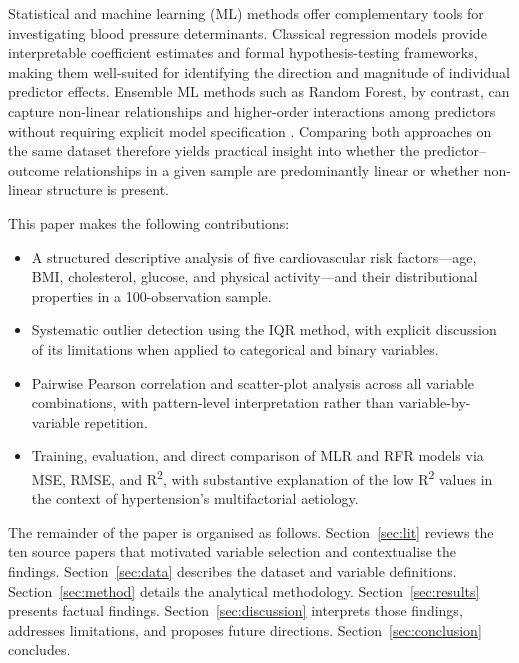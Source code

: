 ﻿\documentclass[conference]{IEEEtran}
\begin{document}
Statistical and machine learning (ML) methods offer complementary tools for investigating blood pressure determinants. Classical regression models provide interpretable coefficient estimates and formal hypothesis-testing frameworks, making them well-suited for identifying the direction and magnitude of individual predictor effects. Ensemble ML methods such as Random Forest, by contrast, can capture non-linear relationships and higher-order interactions among predictors without requiring explicit model specification \cite{plosone2022}. Comparing both approaches on the same dataset therefore yields practical insight into whether the predictor--outcome relationships in a given sample are predominantly linear or whether non-linear structure is present.

This paper makes the following contributions:
\begin{itemize}
  \item A structured descriptive analysis of five cardiovascular risk factors---age, BMI, cholesterol, glucose, and physical activity---and their distributional properties in a 100-observation sample.
  \item Systematic outlier detection using the IQR method, with explicit discussion of its limitations when applied to categorical and binary variables.
  \item Pairwise Pearson correlation and scatter-plot analysis across all variable combinations, with pattern-level interpretation rather than variable-by-variable repetition.
  \item Training, evaluation, and direct comparison of MLR and RFR models via MSE, RMSE, and R\textsuperscript{2}, with substantive explanation of the low R\textsuperscript{2} values in the context of hypertension's multifactorial aetiology.
\end{itemize}

The remainder of the paper is organised as follows. Section~\ref{sec:lit} reviews the ten source papers that motivated variable selection and contextualise the findings. Section~\ref{sec:data} describes the dataset and variable definitions. Section~\ref{sec:method} details the analytical methodology. Section~\ref{sec:results} presents factual findings. Section~\ref{sec:discussion} interprets those findings, addresses limitations, and proposes future directions. Section~\ref{sec:conclusion} concludes.

\end{document}
